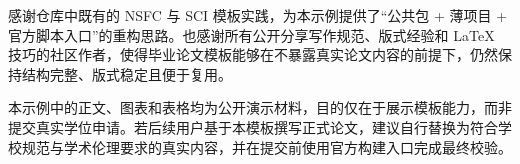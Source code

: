 感谢仓库中既有的 NSFC 与 SCI 模板实践，为本示例提供了“公共包 + 薄项目 + 官方脚本入口”的重构思路。也感谢所有公开分享写作规范、版式经验和 LaTeX 技巧的社区作者，使得毕业论文模板能够在不暴露真实论文内容的前提下，仍然保持结构完整、版式稳定且便于复用。

本示例中的正文、图表和表格均为公开演示材料，目的仅在于展示模板能力，而非提交真实学位申请。若后续用户基于本模板撰写正式论文，建议自行替换为符合学校规范与学术伦理要求的真实内容，并在提交前使用官方构建入口完成最终校验。
